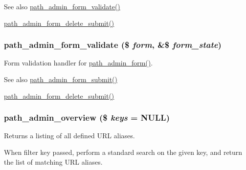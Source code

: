 \begin{DoxySeeAlso}{See also}
\hyperlink{path_8admin_8inc_a4251683f0b26edf9f54db68f4aa5e0b3}{path\_\-admin\_\-form\_\-validate()} 

\hyperlink{path_8admin_8inc_af54710cda76e928325030bf33414b8d3}{path\_\-admin\_\-form\_\-delete\_\-submit()} 
\end{DoxySeeAlso}
\hypertarget{path_8admin_8inc_a4251683f0b26edf9f54db68f4aa5e0b3}{
\subsubsection[{path\_\-admin\_\-form\_\-validate}]{\setlength{\rightskip}{0pt plus 5cm}path\_\-admin\_\-form\_\-validate (\$ {\em form}, \/  \&\$ {\em form\_\-state})}}
\label{path_8admin_8inc_a4251683f0b26edf9f54db68f4aa5e0b3}
Form validation handler for \hyperlink{group__forms_ga712dc47396e1cfb8f1872920973db244}{path\_\-admin\_\-form()}.

\begin{DoxySeeAlso}{See also}
\hyperlink{path_8admin_8inc_a9e4a6b6f202fad04dcdb2bbcd800d168}{path\_\-admin\_\-form\_\-submit()} 

\hyperlink{path_8admin_8inc_af54710cda76e928325030bf33414b8d3}{path\_\-admin\_\-form\_\-delete\_\-submit()} 
\end{DoxySeeAlso}
\hypertarget{path_8admin_8inc_a08b0593e253b2d3813fc7fb9514b9142}{
\subsubsection[{path\_\-admin\_\-overview}]{\setlength{\rightskip}{0pt plus 5cm}path\_\-admin\_\-overview (\$ {\em keys} = {\ttfamily NULL})}}
\label{path_8admin_8inc_a08b0593e253b2d3813fc7fb9514b9142}
Returns a listing of all defined URL aliases.

When filter key passed, perform a standard search on the given key, and return the list of matching URL aliases. 